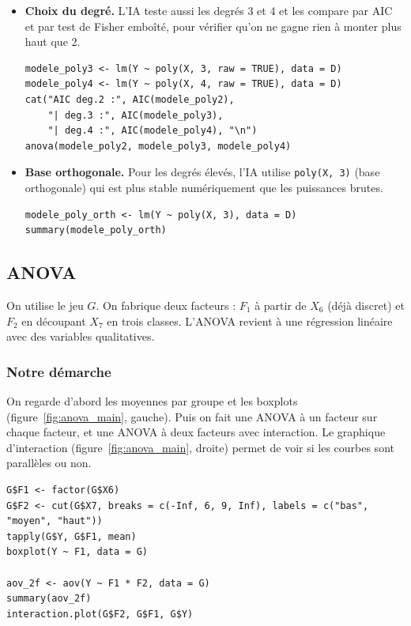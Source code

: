 \documentclass[11pt,a4paper]{article}
\begin{document}
\begin{itemize}
    \item \textbf{Choix du degré.} L'IA teste aussi les degrés 3 et 4 et les compare par AIC et par test de Fisher emboîté, pour vérifier qu'on ne gagne rien à monter plus haut que 2.

\begin{lstlisting}
modele_poly3 <- lm(Y ~ poly(X, 3, raw = TRUE), data = D)
modele_poly4 <- lm(Y ~ poly(X, 4, raw = TRUE), data = D)
cat("AIC deg.2 :", AIC(modele_poly2),
    "| deg.3 :", AIC(modele_poly3),
    "| deg.4 :", AIC(modele_poly4), "\n")
anova(modele_poly2, modele_poly3, modele_poly4)
\end{lstlisting}

    \item \textbf{Base orthogonale.} Pour les degrés élevés, l'IA utilise \texttt{poly(X, 3)} (base orthogonale) qui est plus stable numériquement que les puissances brutes.

\begin{lstlisting}
modele_poly_orth <- lm(Y ~ poly(X, 3), data = D)
summary(modele_poly_orth)
\end{lstlisting}

\end{itemize}

\subsection{ANOVA}

On utilise le jeu $G$. On fabrique deux facteurs : $F_1$ à partir de $X_6$ (déjà discret) et $F_2$ en découpant $X_7$ en trois classes. L'ANOVA revient à une régression linéaire avec des variables qualitatives.

\subsubsection{Notre démarche}

On regarde d'abord les moyennes par groupe et les boxplots (figure~\ref{fig:anova_main}, gauche). Puis on fait une ANOVA à un facteur sur chaque facteur, et une ANOVA à deux facteurs avec interaction. Le graphique d'interaction (figure~\ref{fig:anova_main}, droite) permet de voir si les courbes sont parallèles ou non.

\begin{lstlisting}
G$F1 <- factor(G$X6)
G$F2 <- cut(G$X7, breaks = c(-Inf, 6, 9, Inf), labels = c("bas", "moyen", "haut"))
tapply(G$Y, G$F1, mean)
boxplot(Y ~ F1, data = G)

aov_2f <- aov(Y ~ F1 * F2, data = G)
summary(aov_2f)
interaction.plot(G$F2, G$F1, G$Y)
\end{lstlisting}
\end{document}
